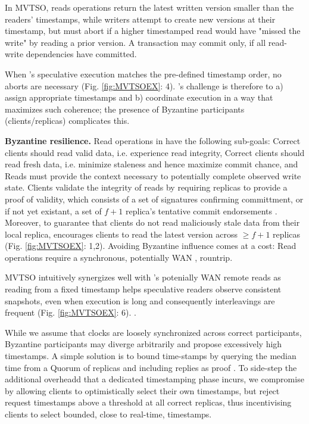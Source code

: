 In MVTSO, reads operations return the latest written version smaller than the readers' timestamps, while writers attempt to create new versions at their timestamp, but must abort if a higher timestamped read would have "missed the write" by reading a prior version. A transaction may commit only, if all read-write dependencies have committed.
\fi

When \sys{}'s speculative execution  matches the pre-defined timestamp order, no aborts are necessary (Fig. \ref{fig:MVTSOEX}: 4). \sys{}'s challenge is therefore to a) assign appropriate timestamps and b) coordinate execution in a way that maximizes such coherence; the presence of Byzantine participants (clients/replicas) complicates this. 

\par \textbf{Byzantine resilience.} Read operations in \sys have the following sub-goals: \one Correct clients should read valid data, i.e. experience read integrity, \two Correct clients should read fresh data, i.e. minimize staleness and hence maximize commit chance, and \three Reads must provide the context necessary to potentially complete observed write state.  
Clients validate the integrity of reads by requiring replicas to provide a proof of validity, which consists of a set of signatures confirming committment, or if not yet existant, a set of  $f+1$ replica's tentative commit endorsements . Moreover, to guarantee that clients do not read maliciously stale data from their local replica, \sys encourages clients to read the latest version across $\geq f+1$ replicas (Fig. \ref{fig:MVTSOEX}: 1,2).
Avoiding Byzantine influence comes at a cost: Read operations require a synchronous, potentially WAN , rountrip. 

MVTSO intuitively synergizes well with \sys{}'s potenially WAN remote reads as reading from a fixed timestamp helps speculative readers observe consistent snapshots, even when execution is long and consequently interleavings are frequent (Fig. \ref{fig:MVTSOEX}: 6). .

While we assume that clocks are loosely synchronized across correct participants, Byzantine participants may diverge arbitrarily and propose excessively high timestamps. A simple solution is to bound time-stamps by querying the median time from a Quorum of replicas and including replies as proof \cite{bazzi2004non, bazzi2018clairvoyant}. To side-step the additional overheadd that a dedicated timestamping phase incurs, we compromise by allowing clients to optimistically select their own timestamps, but reject request timestamps above a threshold at all correct replicas, thus incentivising clients to select bounded, close to real-time, timestamps. 

